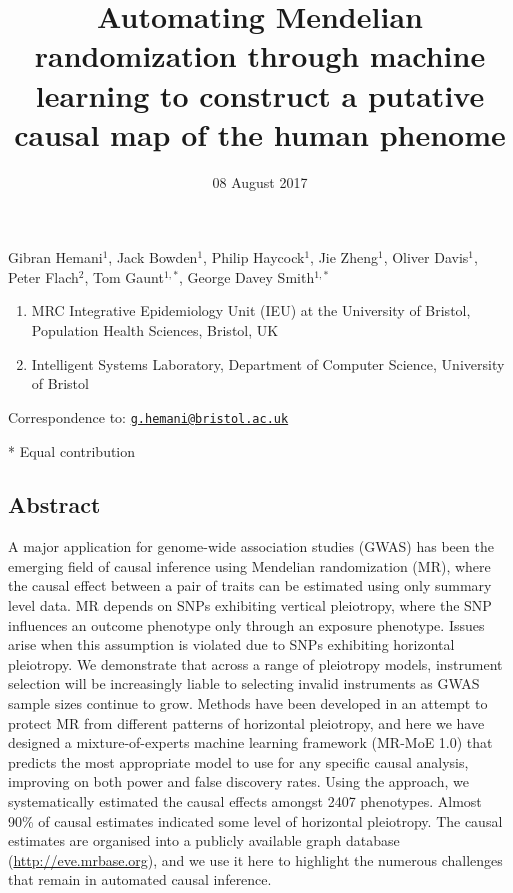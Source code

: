 \documentclass[]{article}
\title{Automating Mendelian randomization through machine learning to construct
a putative causal map of the human phenome}
\author{}
\date{08 August 2017}
\providecommand{\tightlist}{%
  \setlength{\itemsep}{0pt}\setlength{\parskip}{0pt}}
\begin{document}
\maketitle

Gibran Hemani\(^1\), Jack Bowden\(^1\), Philip Haycock\(^1\), Jie
Zheng\(^1\), Oliver Davis\(^1\), Peter Flach\(^2\), Tom Gaunt\(^{1,*}\),
George Davey Smith\(^{1,*}\)

\begin{enumerate}
\def\labelenumi{\arabic{enumi}.}
\tightlist
\item
  MRC Integrative Epidemiology Unit (IEU) at the University of Bristol,
  Population Health Sciences, Bristol, UK
\item
  Intelligent Systems Laboratory, Department of Computer Science,
  University of Bristol
\end{enumerate}

Correspondence to:
\href{mailto:g.hemani@bristol.ac.uk}{\nolinkurl{g.hemani@bristol.ac.uk}}

* Equal contribution

\subsection{Abstract}\label{abstract}

A major application for genome-wide association studies (GWAS) has been
the emerging field of causal inference using Mendelian randomization
(MR), where the causal effect between a pair of traits can be estimated
using only summary level data. MR depends on SNPs exhibiting vertical
pleiotropy, where the SNP influences an outcome phenotype only through
an exposure phenotype. Issues arise when this assumption is violated due
to SNPs exhibiting horizontal pleiotropy. We demonstrate that across a
range of pleiotropy models, instrument selection will be increasingly
liable to selecting invalid instruments as GWAS sample sizes continue to
grow. Methods have been developed in an attempt to protect MR from
different patterns of horizontal pleiotropy, and here we have designed a
mixture-of-experts machine learning framework (MR-MoE 1.0) that predicts
the most appropriate model to use for any specific causal analysis,
improving on both power and false discovery rates. Using the approach,
we systematically estimated the causal effects amongst 2407 phenotypes.
Almost 90\% of causal estimates indicated some level of horizontal
pleiotropy. The causal estimates are organised into a publicly available
graph database (\url{http://eve.mrbase.org}), and we use it here to
highlight the numerous challenges that remain in automated causal
inference.
\end{document}
